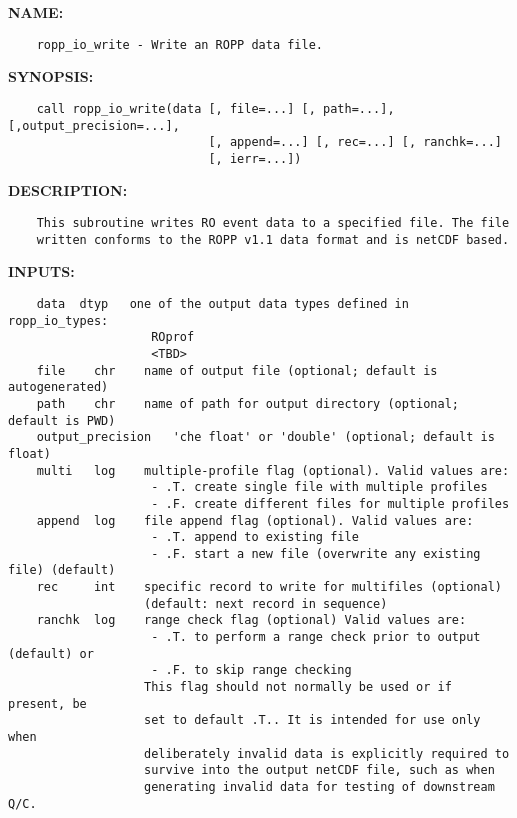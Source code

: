 \label{ch:robo120}
\label{ch:Writing_ropp_io_write}
\textbf{NAME:}\hspace{0.08in}\begin{Verbatim}
    ropp_io_write - Write an ROPP data file.
\end{Verbatim}
\textbf{SYNOPSIS:}\hspace{0.08in}\begin{Verbatim}
    call ropp_io_write(data [, file=...] [, path=...], [,output_precision=...],
                            [, append=...] [, rec=...] [, ranchk=...]
                            [, ierr=...])
\end{Verbatim}
\textbf{DESCRIPTION:}\hspace{0.08in}\begin{Verbatim}
    This subroutine writes RO event data to a specified file. The file
    written conforms to the ROPP v1.1 data format and is netCDF based.
\end{Verbatim}
\textbf{INPUTS:}\hspace{0.08in}\begin{Verbatim}
    data  dtyp   one of the output data types defined in ropp_io_types:
                    ROprof
                    <TBD>
    file    chr    name of output file (optional; default is autogenerated)
    path    chr    name of path for output directory (optional; default is PWD)
    output_precision   'che float' or 'double' (optional; default is float)
    multi   log    multiple-profile flag (optional). Valid values are:
                    - .T. create single file with multiple profiles
                    - .F. create different files for multiple profiles
    append  log    file append flag (optional). Valid values are:
                    - .T. append to existing file
                    - .F. start a new file (overwrite any existing file) (default)
    rec     int    specific record to write for multifiles (optional)
                   (default: next record in sequence)
    ranchk  log    range check flag (optional) Valid values are:
                    - .T. to perform a range check prior to output (default) or
                    - .F. to skip range checking
                   This flag should not normally be used or if present, be
                   set to default .T.. It is intended for use only when
                   deliberately invalid data is explicitly required to
                   survive into the output netCDF file, such as when
                   generating invalid data for testing of downstream Q/C.
\end{Verbatim}
